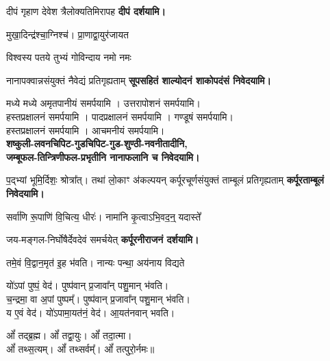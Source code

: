 \begin{center}
{दीपं गृहाण देवेश त्रैलोक्यतिमिरापह}
\textbf{\devAya{} दीपं दर्शयामि।}
\medskip

{मुखा॒दिन्द्र॑श्चा॒ग्निश्च॑। प्रा॒णाद्वा॒युर॑जायत}

{विश्वस्य पतये तुभ्यं गोविन्दाय नमो नमः}

{नानापक्वान्नसंयुक्तं नैवेद्यं प्रतिगृह्यताम्}
\textbf{\devAya{} सूपसहितं शाल्योदनं शाकोपदंसं निवेदयामि।}

मध्ये मध्ये अमृतपानीयं समर्पयामि । उत्तरापोशनं समर्पयामि।\\
हस्तप्रक्षालनं समर्पयामि । पादप्रक्षालनं समर्पयामि । गण्डूषं समर्पयामि।\\
हस्तप्रक्षालनं समर्पयामि । आचमनीयं समर्पयामि।\\
\textbf{\devAya{} शष्कुली-लवनचिपिट-गुडचिपिट-गुड-शुण्ठी-नवनीतादीनि,\\
जम्बूफल-तिन्त्रिणीफल-प्रभृतीनि नानाफलानि च निवेदयामि।}
\medskip

{प॒द्भ्यां भूमि॒र्दिशः॒ श्रोत्रा᳚त्। तथा॑ लो॒काꣳ अ॑कल्पयन्}
{कर्पूरचूर्णसंयुक्तं ताम्बूलं प्रतिगृह्यताम्}
\textbf{\devAya{} कर्पूरताम्बूलं निवेदयामि।}
\medskip

{सर्वा॑णि रू॒पाणि॑ वि॒चित्य॒ धीरः॑। नामा॑नि कृ॒त्वाऽभि॒वद॒न्॒ यदास्ते᳚}

{जय-मङ्गल-निर्घोषैर्देवदेवं समर्चयेत्}
\textbf{\devAya{} कर्पूरनीराजनं दर्शयामि।}
\medskip

{तमे॒वं वि॒द्वान॒मृत॑ इ॒ह भ॑वति। नान्यः पन्था॒ अय॑नाय विद्यते}

यो॑ऽपां पुष्पं॒ वेद॑। पुष्प॑वान् प्र॒जावा᳚न् पशु॒मान् भ॑वति।\\
च॒न्द्रमा॒ वा अ॒पां पुष्पम्᳚। पुष्प॑वान् प्र॒जावा᳚न् पशु॒मान् भ॑वति।\\
य ए॒वं वेद॑। यो॑ऽपामा॒यत॑नं॒ वेद॑। आ॒यत॑नवान् भवति।\medskip

ओं᳚ तद्ब्र॒ह्म। ओं᳚ तद्वा॒युः। ओं᳚ तदा॒त्मा।\\ ओं᳚ तथ्स॒त्यम्।
ओं᳚ तथ्सर्वम्᳚। ओं᳚ तत्पुरो॒र्नमः॥\medskip


\end{center}
